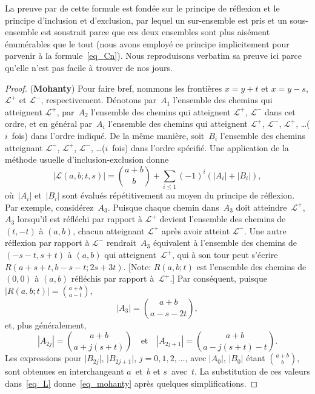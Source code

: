 La preuve par \citet[p.~6]{Mohanty_1979} de cette formule est fondée
sur le principe de réflexion et le principe d'inclusion et
d'exclusion, par lequel un sur-ensemble est pris et un sous-ensemble
est soustrait parce que ces deux ensembles sont plus aisément
énumérables que le tout (nous avons employé ce principe implicitement
pour parvenir à la formule~\eqref{eq_Cn}). Nous reproduisons verbatim
sa preuve ici parce qu'elle n'est pas facile à trouver de nos jours.
\begin{proof}
  (\textbf{Mohanty}) Pour faire bref, nommons les frontières \(x=y+t\)
  et \(x=y-s\), \(\mathcal{L}^{+}\) et \(\mathcal{L}^{-}\),
  respectivement. Dénotons par~\(A_1\) l'ensemble des chemins qui
  atteignent \(\mathcal{L}^{+}\), par~\(A_2\) l'ensemble des chemins
  qui atteignent \(\mathcal{L}^{+}\), \(\mathcal{L}^{-}\) dans cet
  ordre, et en général par~\(A_i\) l'ensemble des chemins qui
  atteignent \(\mathcal{L}^{+}\), \(\mathcal{L}^{-}\),
  \(\mathcal{L}^{+}\), \ldots (\(i\)~fois) dans l'ordre indiqué. De la
  même manière, soit~\(B_i\) l'ensemble des chemins atteignant
  \(\mathcal{L}^{-}\), \(\mathcal{L}^{+}\), \(\mathcal{L}^{-}\),
  \ldots (\(i\)~fois) dans l'ordre spécifié. Une application de la
  méthode usuelle d'inclusion\--exclusion donne
  \begin{equation}
    \left\lvert\mathcal{L}(a,b;t,s)\right\rvert = \binom{a+b}{b} +
    \sum_{i \leqslant 1}(-1)^{i}(\lvert{A_i}\rvert +
    \lvert{B_i}\rvert),\label{eq_L}
  \end{equation}
  où~\(\lvert{A_i}\rvert\) et~\(\lvert{B_i}\rvert\) sont évalués
  répétitivement au moyen du principe de réflexion. Par exemple,
  considérez~\(A_3\). Puisque chaque chemin dans~\(A_3\) doit
  atteindre~\(\mathcal{L}^{+}\), \(A_3\) lorsqu'il est réfléchi par
  rapport à \(\mathcal{L}^{+}\) devient l'ensemble des chemins de
  \((t,-t)\) à \((a,b)\), chacun atteignant \(\mathcal{L}^{+}\) après
  avoir atteint \(\mathcal{L}^{-}\). Une autre réflexion par rapport à
  \(\mathcal{L}^{-}\) rendrait~\(A_3\) équivalent à l'ensemble des
  chemins de \((-s-t,s+t)\) à \((a,b)\) qui
  atteignent~\(\mathcal{L}^{+}\), qui à son tour peut s'écrire
  \(R(a+s+t,b-s-t; 2s+3t)\). [Note: \(R(a,b;t)\) est l'ensemble des
    chemins de \((0,0)\) à \((a,b)\) réfléchis par rapport
    à~\(\mathcal{L}^{+}\).] Par conséquent, puisque
  \(\lvert{R(a,b;t)}\rvert = \binom{a+b}{a-t}\),
  \begin{equation*}
    \left\lvert{A_3}\right\rvert = \binom{a+b}{a-s-2t},
  \end{equation*}
  et, plus généralement,
  \begin{equation*}
    \left\lvert{A_{2j}}\right\rvert = \binom{a+b}{a+j(s+t)}
    \quad\text{et}\quad \left\lvert{A_{2j+1}}\right\rvert =
    \binom{a+b}{a-j(s+t)-t}.
  \end{equation*}
  Les expressions pour \(\lvert{B_{2j}}\rvert\),
  \(\lvert{B_{2j+1}}\rvert\), \(j=0, 1, 2, \dots\), avec
  \(\lvert{A_0}\rvert\), \(\lvert{B_0}\rvert\) étant
  \(\binom{a+b}{b}\), sont obtenues en interchangeant \(a\)~et~\(b\)
  et \(s\)~avec~\(t\). La substitution de ces valeurs
  dans~\eqref{eq_L} donne~\eqref{eq_mohanty} après quelques
  simplifications.
\end{proof}


